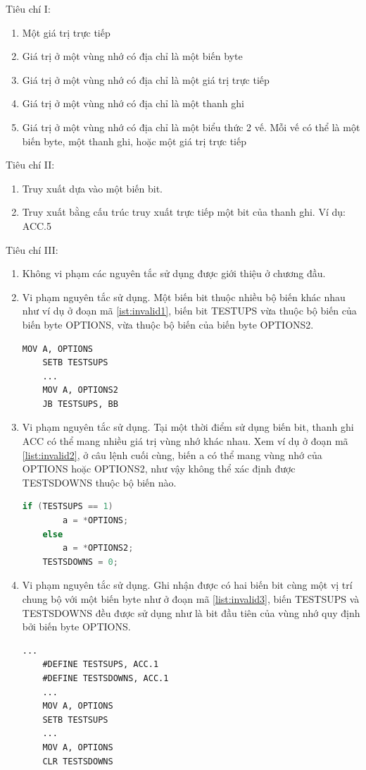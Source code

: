 Tiêu chí I:
\begin{enumerate}
	\item Một giá trị trực tiếp
	\item Giá trị ở một vùng nhớ có địa chỉ là một biến byte
	\item Giá trị ở một vùng nhớ có địa chỉ là một giá trị trực tiếp
	\item Giá trị ở một vùng nhớ có địa chỉ là một thanh ghi
	\item Giá trị ở một vùng nhớ có địa chỉ là một biểu thức 2 vế. Mỗi vế có thể là một biến byte, một thanh ghi, hoặc một giá trị trực tiếp
\end{enumerate}

Tiêu chí II:
\begin{enumerate}
	\item Truy xuất dựa vào một biến bit.
	\item Truy xuất bằng cấu trúc truy xuất trực tiếp một bit của thanh ghi. Ví dụ: ACC.5
\end{enumerate}

Tiêu chí III:
\begin{enumerate}
	\item Không vi phạm các nguyên tắc sử dụng được giới thiệu ở chương đầu.
	\item Vi phạm nguyên tắc sử dụng. Một biến bit thuộc nhiều bộ biến khác nhau như ví dụ ở đoạn mã \ref{ist:invalid1}, biến bit TESTUPS vừa thuộc bộ biến của biến byte OPTIONS, vừa thuộc bộ biến của biến byte OPTIONS2.
	\begin{lstlisting}[caption={Đoạn mã có một biến bit thuộc nhiều bộ biến khác nhau},label={list:invalid1}]
	MOV A, OPTIONS
	SETB TESTSUPS
	...
	MOV A, OPTIONS2
	JB TESTSUPS, BB
	\end{lstlisting}
	\item Vi phạm nguyên tắc sử dụng. Tại một thời điểm sử dụng biến bit, thanh ghi ACC có thể mang nhiều giá trị vùng nhớ khác nhau. Xem ví dụ ở đoạn mã \ref{list:invalid2}, ở câu lệnh cuối cùng, biến a có thể mang vùng nhớ của OPTIONS hoặc OPTIONS2, như vậy không thể xác định được TESTSDOWNS thuộc bộ biến nào.
	\begin{lstlisting}[caption={Đoạn mã ACC có thể mang nhiều giá trị vùng nhớ khác nhau},label={list:invalid2}, language=c++]
	if (TESTSUPS == 1)
		a = *OPTIONS;
	else
		a = *OPTIONS2;
	TESTSDOWNS = 0;
	\end{lstlisting}
	\item Vi phạm nguyên tắc sử dụng. Ghi nhận được có hai biến bit cùng một vị trí chung bộ với một biến byte như ở đoạn mã \ref{list:invalid3}, biến TESTSUPS và TESTSDOWNS đều được sử dụng như là bit đầu tiên của vùng nhớ quy định bởi biến byte OPTIONS.
	\begin{lstlisting}[caption={Đoạn mã có 2 biến bit cùng một vị trí và đều được ghi nhận cùng bộ với một biến byte},label={list:invalid3}]
	...
	#DEFINE TESTSUPS, ACC.1
	#DEFINE TESTSDOWNS, ACC.1
	...
	MOV A, OPTIONS
	SETB TESTSUPS
	...
	MOV A, OPTIONS
	CLR TESTSDOWNS
	\end{lstlisting}
\end{enumerate}

